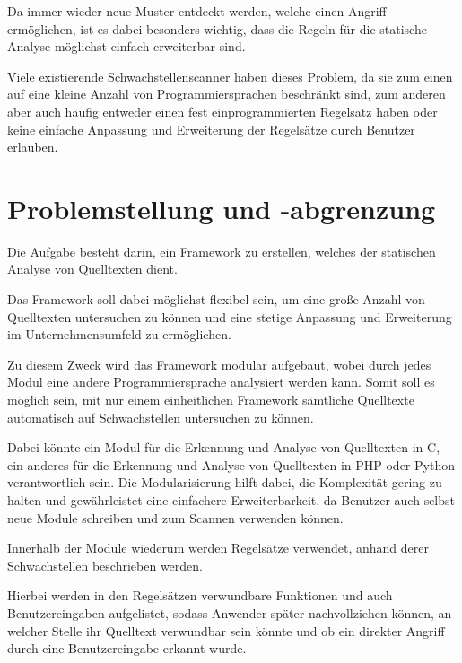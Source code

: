         Da immer wieder neue Muster entdeckt werden,
        welche einen Angriff ermöglichen,
        ist es dabei besonders wichtig,
        dass die Regeln für die statische Analyse möglichst einfach erweiterbar sind.

        Viele existierende Schwachstellenscanner haben dieses Problem,
        da sie zum einen auf eine kleine Anzahl von Programmiersprachen beschränkt sind,
        zum anderen aber auch häufig entweder einen fest einprogrammierten Regelsatz haben oder
        keine einfache Anpassung und Erweiterung der Regelsätze durch Benutzer erlauben.

    \section{Problemstellung und -abgrenzung}\label{Problemstellung und -abgrenzung}
        Die Aufgabe besteht darin,
        ein Framework zu erstellen,
        welches der statischen Analyse von Quelltexten dient.

        Das Framework soll dabei möglichst flexibel sein,
        um eine große Anzahl von Quelltexten untersuchen zu können und
        eine stetige Anpassung und
        Erweiterung im Unternehmensumfeld zu ermöglichen.

        Zu diesem Zweck wird das Framework modular aufgebaut,
        wobei durch jedes Modul eine andere Programmiersprache analysiert werden kann.
        Somit soll es möglich sein,
        mit nur einem einheitlichen Framework sämtliche Quelltexte automatisch auf Schwachstellen untersuchen zu können.

        Dabei könnte ein Modul für die Erkennung und
        Analyse von Quelltexten in C,
        ein anderes für die Erkennung und
        Analyse von Quelltexten in
        \gls{PHP} oder
        Python verantwortlich sein.
        Die Modularisierung hilft dabei,
        die Komplexität gering zu halten und
        gewährleistet eine einfachere Erweiterbarkeit,
        da Benutzer auch selbst neue Module schreiben und
        zum Scannen verwenden können.

        Innerhalb der Module wiederum werden Regelsätze verwendet,
        anhand derer Schwachstellen beschrieben werden.

        Hierbei werden in den Regelsätzen verwundbare Funktionen und
        auch Benutzereingaben aufgelistet,
        sodass Anwender später nachvollziehen können,
        an welcher Stelle ihr Quelltext verwundbar sein könnte und
        ob ein direkter Angriff durch eine Benutzereingabe erkannt wurde.

